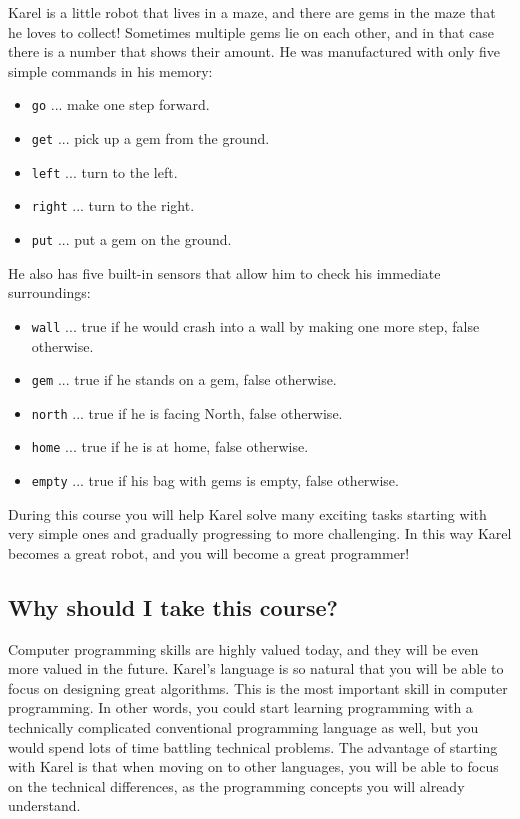 Karel is a little robot that lives in a maze, and there are gems in the maze that he loves to collect!
Sometimes multiple gems lie on each other, and in that case there is a number that shows their amount.
He was manufactured with only five simple commands in his memory:
\begin{itemize}
\item {\color{green} \tt go} ... make one step forward.
\item {\color{green} \tt get} ... pick up a gem from the ground. 
\item {\color{green} \tt left} ... turn to the left.
\item {\color{green} \tt right} ... turn to the right. 
\item {\color{green} \tt put} ... put a gem on the ground. 
\end{itemize}
He also has five built-in sensors that allow him to check his immediate surroundings:
\begin{itemize}
\item {\color{green} \tt wall} ... true if he would crash into a wall by making one more step, false otherwise. 
\item {\color{green} \tt gem} ... true if he stands on a gem, false otherwise.
\item {\color{green} \tt north} ... true if he is facing North, false otherwise.
\item {\color{green} \tt home} ... true if he is at home, false otherwise.
\item {\color{green} \tt empty} ... true if his bag with gems is empty, false otherwise. 
\end{itemize}
During this course you will help Karel solve many exciting tasks starting with very simple ones and 
gradually progressing to more challenging. In this way Karel becomes a great robot, and you 
will become a great programmer!

\subsection{Why should I take this course?}

Computer programming skills are highly valued today, and they will be even more 
valued in the future. Karel's language is so natural that you will be able to 
focus on designing great algorithms. This is the most important skill in 
computer programming. In other words, you could start learning programming 
with a technically 
complicated conventional programming language as well, but you would spend lots of time 
battling technical problems. The advantage of starting with Karel is that 
when moving on to other languages, you will be able to focus on the technical 
differences, as the programming concepts you will already understand.


